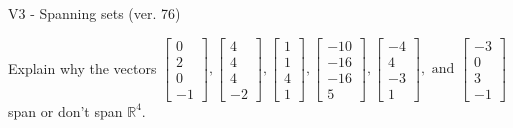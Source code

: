 \begin{exercise}
  \begin{exerciseTitle}V3 - Spanning sets (ver. 76)\end{exerciseTitle}
  \begin{exerciseStatement}
    Explain why the vectors \(\left[\begin{array}{r}
0 \\
2 \\
0 \\
-1
\end{array}\right] , \left[\begin{array}{r}
4 \\
4 \\
4 \\
-2
\end{array}\right] , \left[\begin{array}{r}
1 \\
1 \\
4 \\
1
\end{array}\right] , \left[\begin{array}{r}
-10 \\
-16 \\
-16 \\
5
\end{array}\right] , \left[\begin{array}{r}
-4 \\
4 \\
-3 \\
1
\end{array}\right] , \text{ and } \left[\begin{array}{r}
-3 \\
0 \\
3 \\
-1
\end{array}\right]\) span or don't span \(\mathbb{R}^4\). 
	



\end{exerciseStatement}
\end{exercise}
